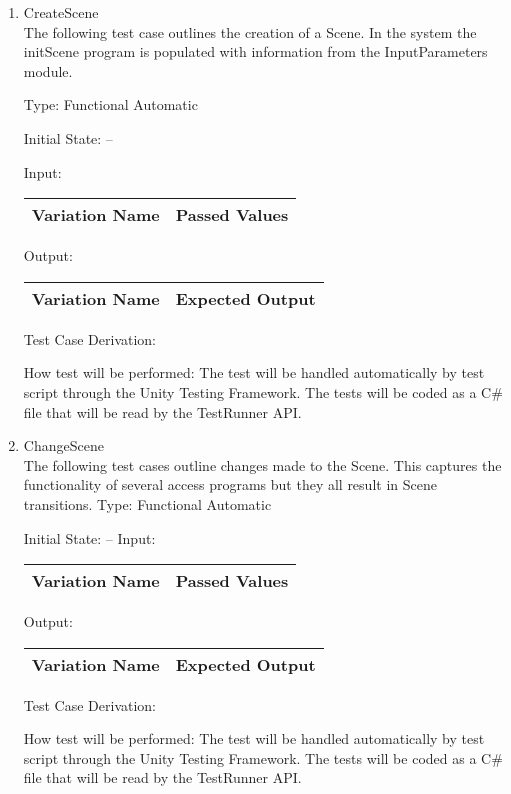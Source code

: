 \documentclass[12pt, titlepage]{article}
\begin{document}
\begin{enumerate}
	
	\item{CreateScene\\}
	The following test case outlines the creation of a Scene. In the system the 
	initScene program is populated with information from the InputParameters 
	module.
	
	Type: Functional Automatic
	
	Initial State: --
	
	Input: 
	\begin{tabular}{|c|p{8cm}|}
		\hline
		\textbf{Variation Name} & \textbf{Passed Values}\\
		\hline

		\hline
	\end{tabular}
	
	Output: 
	\begin{tabular}{|c|c|}
		\hline
		\textbf{Variation Name} & \textbf{Expected Output}\\
		\hline
		
		\hline
	\end{tabular}
	
	Test Case Derivation: 
	
	How test will be performed: The test will be handled automatically by test 
	script through the Unity Testing Framework. The tests will be coded as a 
	C\# file that will be read by the TestRunner API.
	
	\item{ChangeScene\\}
	The following test cases outline changes made to the Scene. This captures 
	the functionality of several access programs but they all result in Scene 
	transitions.
	Type: Functional Automatic
	
	Initial State: --
	Input: 
	\begin{tabular}{|c|c|}
		\hline
		\textbf{Variation Name} & \textbf{Passed Values}\\
		\hline
		
		\hline
	\end{tabular}
	
	Output:
	\begin{tabular}{|c|c|}
		\hline
		\textbf{Variation Name} & \textbf{Expected Output}\\
		\hline
		
		\hline
	\end{tabular}
	
	Test Case Derivation: 
	
	How test will be performed: The test will be handled automatically by test 
	script through the Unity Testing Framework. The tests will be coded as a 
	C$\#$ file that will be read by the TestRunner API.  
	
\end{enumerate}
\end{document}
